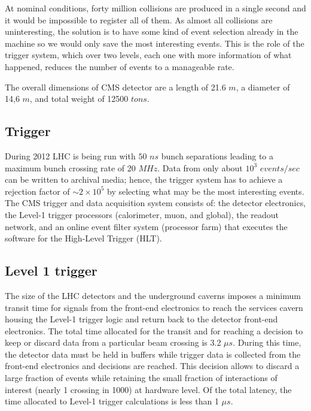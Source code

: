 \documentclass[%
reprint,
amsmath,
amssymb,
aps,
pra,
showkeys
]{revtex4-1}
\begin{document}
At nominal conditions, forty million collisions are produced in a single second and it would be impossible to
register all of them. As almost all collisions are uninteresting, the solution is to have some kind of event selection
already in the machine so we would only save the most interesting events. This is the role of the trigger system,
which over two levels, each one with more information of what happened, reduces the number of events to a
manageable rate.

The overall dimensions of CMS detector are a length of 21.6 $m$, a diameter of 14,6 $m$, and total weight of
12500 $tons$.

\subsection{Trigger}

During 2012 LHC is being run with $50$ $ns$ bunch separations leading to a maximum bunch crossing rate of 20 $MHz$. 
Data from only about $10^3$ $events/sec$ can be written to archival media; hence, the trigger system has to achieve a
rejection factor of $\sim 2 \times 10^5$ by selecting what may be the most interesting events. The CMS trigger and data 
acquisition system consists of: the detector electronics, the Level-1 trigger processors (calorimeter, muon, and global), 
the readout network, and an online event filter system (processor farm) that executes the software for the High-Level 
Trigger (HLT).

\subsection{Level 1 trigger}

The size of the LHC detectors and the underground caverns imposes a minimum transit time for signals from
the front-end electronics to reach the services cavern housing the Level-1 trigger logic and return back to the
detector front-end electronics. The total time allocated for the transit and for reaching a decision to keep or
discard data from a particular beam crossing is 3.2 $\mu s$. During this time, the detector data must be held in
buffers while trigger data is collected from the front-end electronics and decisions are reached. This decision
allows to discard a large fraction of events while retaining the small fraction of interactions of interest (nearly
1 crossing in 1000) at hardware level. Of the total latency, the time allocated to Level-1 trigger calculations
is less than 1 $\mu s$.
\end{document}
